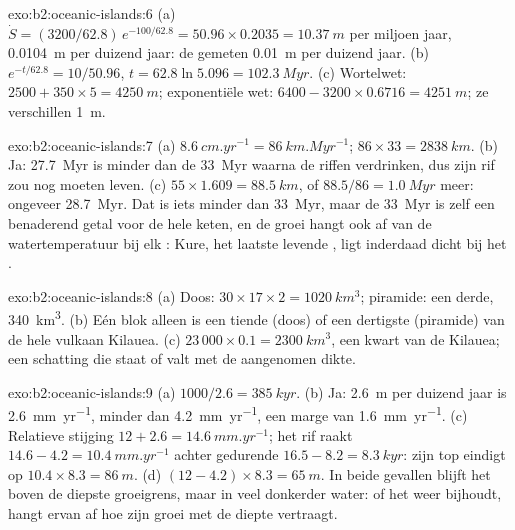 \begin{solution}{exo:b2:oceanic-islands:6}
(a) $\dot S = (3200/62.8)\,e^{-100/62.8} = 50.96\times0.2035 = \qty{10.37}{m}$ per miljoen jaar,
\qty{0.0104}{m} per duizend jaar: de gemeten \qty{0.01}{m} per duizend jaar. (b) $e^{-t/62.8}
= 10/50.96$, $t = 62.8\ln5.096 = \qty{102.3}{Myr}$. (c) Wortelwet: $2500 + 350\times5 =
\qty{4250}{m}$; exponentiële wet: $6400 - 3200\times0.6716 = \qty{4251}{m}$; ze verschillen
\qty{1}{m}.
\end{solution}

\begin{solution}{exo:b2:oceanic-islands:7}
(a) $\qty{8.6}{cm.yr^{-1}} = \qty{86}{km.Myr^{-1}}$; $86\times33 = \qty{2838}{km}$. (b) Ja:
\qty{27.7}{Myr} is minder dan de \qty{33}{Myr} waarna de riffen verdrinken, dus zijn rif zou
nog moeten leven. (c) $55\times1.609 = \qty{88.5}{km}$, of $88.5/86 = \qty{1.0}{Myr}$ meer: ongeveer
\qty{28.7}{Myr}. Dat is iets minder dan \qty{33}{Myr}, maar de \qty{33}{Myr} is zelf een
benaderend getal voor de hele keten, en de groei hangt ook af van de watertemperatuur bij elk
: Kure, het laatste levende , ligt inderdaad dicht bij het .
\end{solution}

\begin{solution}{exo:b2:oceanic-islands:8}
(a) Doos: $30\times17\times2 = \qty{1020}{km^3}$; piramide: een derde, \qty{340}{km^3}. (b) Eén blok
alleen is een tiende (doos) of een dertigste (piramide) van de hele vulkaan Kilauea. (c) $23\,000\times
0.1 = \qty{2300}{km^3}$, een kwart van de Kilauea; een schatting die staat of valt met de aangenomen
dikte.
\end{solution}

\begin{solution}{exo:b2:oceanic-islands:9}
(a) $1000/2.6 = \qty{385}{kyr}$. (b) Ja: \qty{2.6}{m} per duizend jaar is
\qty{2.6}{mm.yr^{-1}}, minder dan \qty{4.2}{mm.yr^{-1}}, een marge van \qty{1.6}{mm.yr^{-1}}.
(c) Relatieve stijging $12 + 2.6 = \qty{14.6}{mm.yr^{-1}}$; het rif raakt $14.6 - 4.2 =
\qty{10.4}{mm.yr^{-1}}$ achter gedurende $16.5 - 8.2 = \qty{8.3}{kyr}$: zijn top eindigt op $10.4\times8.3 =
\qty{86}{m}$. (d) $(12 - 4.2)\times8.3 = \qty{65}{m}$. In beide gevallen blijft het boven de diepste
groeigrens, maar in veel donkerder water: of het weer bijhoudt, hangt ervan af hoe zijn groei met de
diepte vertraagt.
\end{solution}

